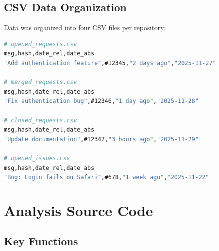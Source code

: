 \subsection{CSV Data Organization}

Data was organized into four CSV files per repository:

\begin{lstlisting}[language=bash, caption=CSV File Structure]
# opened_requests.csv
msg,hash,date_rel,date_abs
"Add authentication feature",#12345,"2 days ago","2025-11-27"

# merged_requests.csv
msg,hash,date_rel,date_abs
"Fix authentication bug",#12346,"1 day ago","2025-11-28"

# closed_requests.csv
msg,hash,date_rel,date_abs
"Update documentation",#12347,"3 hours ago","2025-11-29"

# opened_issues.csv
msg,hash,date_rel,date_abs
"Bug: Login fails on Safari",#678,"1 week ago","2025-11-22"
\end{lstlisting}

\section{Analysis Source Code}

\subsection{Key Functions}

